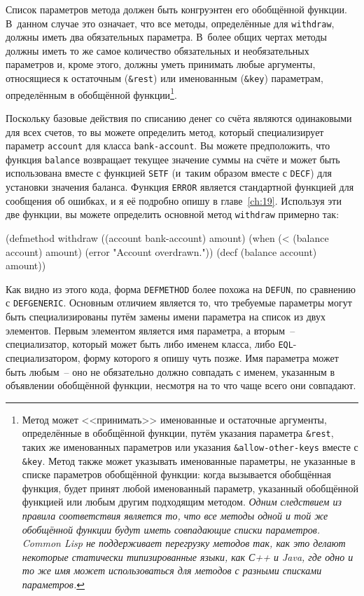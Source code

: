 Список параметров метода должен быть конгруэнтен его обобщённой функции.  В~данном случае
это означает, что все методы, определённые для \lstinline{withdraw}, должны иметь два
обязательных параметра.  В~более общих чертах методы должны иметь то же самое количество
обязательных и необязательных параметров и, кроме этого, должны уметь принимать любые
аргументы, относящиеся к остаточным (\lstinline!&rest!) или именованным (\lstinline!&key!)
параметрам, определённым в обобщённой функции\footnote{Метод может <<принимать>>
  именованные и остаточные аргументы, определённые в обобщённой функции, путём указания
  параметра \lstinline!&rest!, таких же именованных параметров или указания
  \lstinline!&allow-other-keys! вместе с \lstinline!&key!.  Метод также может указывать
  именованные параметры, не указанные в списке параметров обобщённой функции: когда
  вызывается обобщённая функция, будет принят любой именованный параметр, указанный
  обобщённой функцией или любым другим подходящим методом.  \textit{Одним следствием
    из правила соответствия является то, что все методы одной и той же обобщённой функции
    будут иметь совпадающие списки параметров.  Common Lisp не поддерживает перегрузку
    методов так, как это делают некоторые статически типизированные языки, как С++ и Java,
    где одно и то же имя может использоваться для методов с разными списками параметров.}
}.

Поскольку базовые действия по списанию денег со счёта являются одинаковыми для всех
счетов, то вы можете определить метод, который специализирует параметр \lstinline{account}
для класса \lstinline{bank-account}.  Вы можете предположить, что функция
\lstinline{balance} возвращает текущее значение суммы на счёте и может быть использована
вместе с функцией \lstinline{SETF} (и~таким образом вместе с \lstinline{DECF}) для
установки значения баланса.  Функция \lstinline{ERROR} является стандартной функцией для
сообщения об ошибках, и я её подробно опишу в главе~\ref{ch:19}.  Используя эти две
функции, вы можете определить основной метод \lstinline{withdraw} примерно так:

\begin{myverb}
(defmethod withdraw ((account bank-account) amount)
  (when (< (balance account) amount)
    (error "Account overdrawn."))
  (decf (balance account) amount))
\end{myverb}

Как видно из этого кода, форма \lstinline{DEFMETHOD} более похожа на \lstinline{DEFUN}, по сравнению
с \lstinline{DEFGENERIC}.  Основным отличием является то, что требуемые параметры могут быть
специализированы путём замены имени параметра на список из двух элементов.  Первым
элементом является имя параметра, а вторым~-- специализатор, который может быть либо
именем класса, либо \lstinline{EQL}-специализатором, форму которого я опишу чуть позже.  Имя
параметра может быть любым~-- оно не обязательно должно совпадать с именем, указанным в
объявлении обобщённой функции, несмотря на то что чаще всего они совпадают.

